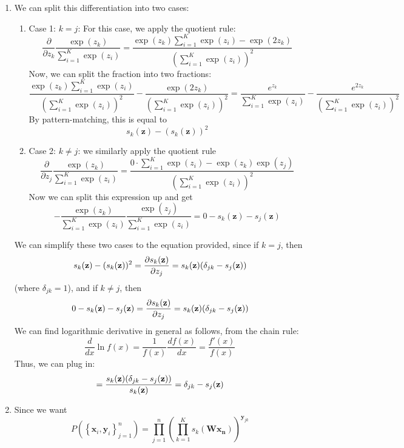 \documentclass[submit]{harvardml}
\newenvironment{ans}{
  \begin{enumerate}
  \color{blue}
}{
  \end{enumerate}
  \color{black}
}
\begin{document}
\newpage
\begin{ans}
    \item We can split this differentiation into two cases:
    \begin{enumerate}
        \item Case 1: $k = j$: For this case, we apply the quotient rule: 
        $$
        \frac{\partial }{\partial z_k} \frac{\exp(z_k)}{\sum_{i = 1}^K \exp(z_i)} = \frac{\exp(z_k)\sum_{i = 1}^K \exp(z_i) - \exp(2z_k)}{\left(\sum_{i = 1}^K \exp(z_i)\right)^2}
        $$
        Now, we can split the fraction into two fractions:
        $$
        \frac{\exp(z_k)\sum_{i = 1}^K \exp(z_i)}{\left(\sum_{i = 1}^K \exp(z_i)\right)^2} - \frac{\exp(2z_k)}{\left(\sum_{i = 1}^K \exp(z_i)\right)^2} = \frac{e^{z_k}}{\sum_{i = 1}^K \exp(z_i)} - \frac{e^{2z_k}}{\left(\sum_{i = 1}^K \exp(z_i)\right)^2}
        $$
        By pattern-matching, this is equal to 
        $$
        s_{k}(\mathbf z) - (s_{k}(\mathbf z))^2
        $$
        \item Case 2: $k \neq j$: we similarly apply the quotient rule
        $$
        \frac{\partial }{\partial z_j} \frac{\exp(z_k)}{\sum_{i = 1}^K \exp(z_i)} = \frac{0 \cdot \sum_{i = 1}^K \exp(z_i) - \exp(z_k)\exp(z_j)}{\left(\sum_{i = 1}^K \exp(z_i)\right)^2}
        $$
        Now we can split this expression up and get
        $$
        -\frac{\exp(z_k)}{\sum_{i = 1}^K \exp(z_i)}\frac{\exp(z_j)}{\sum_{i = 1}^K \exp(z_i)} = 0 - s_k(\mathbf z) -s_j(\mathbf z)
        $$
    \end{enumerate}
    We can simplify these two cases to the equation provided, since if 
    $k = j$, then
    $$
    s_{k}(\mathbf z) - (s_{k}(\mathbf z))^2 = \frac{\partial s_k(\mathbf{z})}{\partial z_j} = s_k(\mathbf{z})(\delta_{jk} - s_j(\mathbf{z}))
    $$
    (where $\delta_{jk} = 1$), and if $k \neq j$, then 
    $$
    0 - s_k(\mathbf z) -s_j(\mathbf z) = \frac{\partial s_k(\mathbf{z})}{\partial z_j} = s_k(\mathbf{z})(\delta_{jk} - s_j(\mathbf{z}))
    $$
    \newline
    \newline
    We can find logarithmic derivative in general as follows, from the chain rule:
    $$
    \frac{d}{dx}\ln f(x) = \frac{1}{f(x)}\frac{df(x)}{dx} = \frac{f'(x)}{f(x)}
    $$
    Thus, we can plug in:
    $$
    = \frac{s_k(\mathbf{z})(\delta_{jk} - s_j(\mathbf{z}))}{s_k(\mathbf{z})} = \delta_{jk} - s_j(\mathbf{z})
    $$
    \item Since we want 
    $$
    P(\left\{\mathbf x_i, \mathbf y_i\right\}_{j = 1}^n) = \prod_{j = 1}^n\left(\prod_{k = 1}^K s_k(\mathbf{Wx_n})\right)^{\mathbf y_{jk}}
$$
\end{ans}
\end{document}
